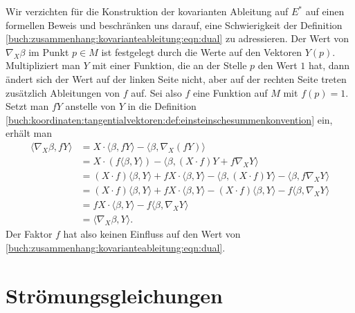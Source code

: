Wir verzichten für die Konstruktion der kovarianten Ableitung auf $E^*$
auf einen formellen Beweis und beschränken uns darauf, eine Schwierigkeit
der Definition \eqref{buch:zusammenhang:kovarianteableitung:eqn:dual}
zu adressieren.
Der Wert von $\nabla_X\beta$ im Punkt $p\in M$ ist festgelegt durch
die Werte auf den Vektoren $Y(p)$.
Multipliziert man $Y$ mit einer Funktion, die an der Stelle $p$ den Wert
$1$ hat, dann ändert sich der Wert auf der linken Seite nicht, aber
auf der rechten Seite treten zusätzlich Ableitungen von $f$ auf.
Sei also $f$ eine Funktion auf $M$ mit $f(p)=1$.
Setzt man $fY$ anstelle von $Y$ in die Definition
\eqref{buch:koordinaten:tangentialvektoren:def:einsteinschesummenkonvention}
ein, erhält man
\begin{align*}
\langle
\nabla_X \beta,fY
\rangle
&=
X\cdot\langle \beta,fY\rangle
-
\langle \beta,\nabla_X(fY)\rangle
\\
&=
X\cdot(f\langle \beta,Y\rangle)
-
\langle \beta,
(X\cdot f)Y
+
f\nabla_XY
\rangle
\\
&=
(X\cdot f)\langle \beta,Y\rangle
+
fX\cdot \langle \beta,Y\rangle
-
\langle \beta,
(X\cdot f)Y
\rangle
-
\langle \beta,
f\nabla_XY
\rangle
\\
&=
(X\cdot f)
\langle \beta,Y\rangle
+
f X\cdot \langle \beta,Y\rangle
-
(X\cdot f) \langle \beta, Y \rangle
-
f\langle \beta, \nabla_XY \rangle
\\
&=
f X\cdot \langle \beta,Y\rangle
-
f\langle \beta, \nabla_XY \rangle
\\
&=
\langle \nabla_X\beta,Y\rangle.
\end{align*}
Der Faktor $f$ hat also keinen Einfluss auf den Wert von
\eqref{buch:zusammenhang:kovarianteableitung:eqn:dual}.


%
%
\section{Strömungsgleichungen
\label{buch:zusammenhang:section:stroemungsgleichungen}}




